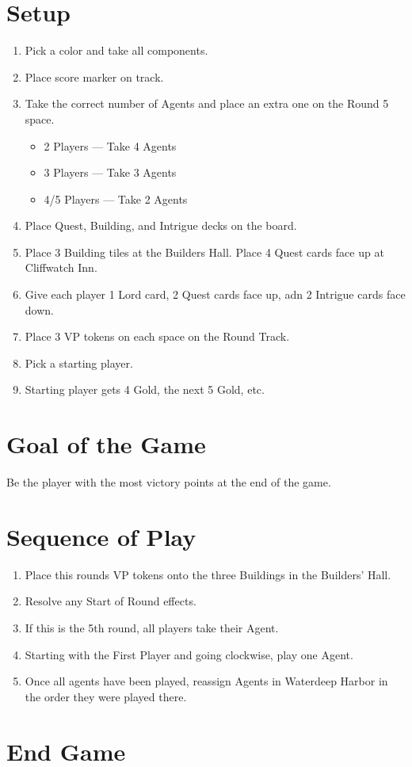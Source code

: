 \documentclass[12pt]{article}
\newenvironment{enumerateCustom}
{\begin{enumerate}
  \setlength{\itemsep}{1pt}
  \setlength{\parskip}{0pt}
  \setlength{\parsep}{0pt}}
{\end{enumerate}}
\newenvironment{itemizeCustom}
{\begin{itemize}
  \setlength{\itemsep}{1pt}
  \setlength{\parskip}{0pt}
  \setlength{\parsep}{0pt}}
{\end{itemize}}
\begin{document}
\begin{mdframed}[style = customFrame]
\begin{multicols*}{2}

\section*{Setup}
\begin{enumerateCustom}
	\item Pick a color and take all components. 
	\item Place score marker on track.
	\item Take the correct number of Agents and place an extra one on the Round 5 space.
		\begin{itemizeCustom}
			\item 2 Players --- Take 4 Agents
			\item 3 Players --- Take 3 Agents
			\item 4/5 Players --- Take 2 Agents
		\end{itemizeCustom}
	\item Place Quest, Building, and Intrigue decks on the board.
	\item Place 3 Building tiles at the Builders Hall. Place 4 Quest cards face up at Cliffwatch Inn.
	\item Give each player 1 Lord card, 2 Quest cards face up, adn 2 Intrigue cards face down.
	\item Place 3 VP tokens on each space on the Round Track.
	\item Pick a starting player.
	\item Starting player gets 4 Gold, the next 5 Gold, etc.
\end{enumerateCustom}

\section*{Goal of the Game}
Be the player with the most victory points at the end of the game.

\section*{Sequence of Play}
\begin{enumerateCustom}
	\item Place this rounds VP tokens onto the three Buildings in the Builders' Hall.
	\item Resolve any Start of Round effects.
	\item If this is the 5th round, all players take their Agent.
	\item Starting with the First Player and going clockwise, play one Agent.
	\item Once all agents have been played, reassign Agents in Waterdeep Harbor in the order they were played there.

\end{enumerateCustom}
\section*{End Game}

\end{multicols*}
\end{mdframed}
\end{document}
